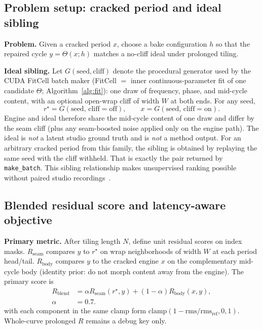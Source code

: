 \subsection{Problem setup: cracked period and ideal sibling}
\label{sec:ideal-tile}

\textbf{Problem.} Given a cracked period $x$, choose a bake configuration $h$ so that the repaired cycle $y=\Theta(x;h)$ matches a no-cliff ideal under prolonged tiling.

\textbf{Ideal sibling.}
Let $G(\mathrm{seed},\mathrm{cliff})$ denote the procedural generator used by the CUDA FitCell batch maker
(FitCell $=$ inner continuous-parameter fit of one candidate $\Theta$; Algorithm~\ref{alg:fit}):
one draw of frequency, phase, and mid-cycle content, with an optional open-wrap cliff of width $W$ at both ends.
For any seed,
\begin{equation}
\label{eq:G-siblings}
r^{\star}=G(\mathrm{seed},\,\mathrm{cliff{=}off}),\qquad
x=G(\mathrm{seed},\,\mathrm{cliff{=}on}).
\end{equation}
Engine and ideal therefore share the mid-cycle content of one draw and differ by the seam cliff (plus any seam-boosted noise applied only on the engine path).
The ideal is \emph{not} a latent studio ground truth and is \emph{not} a method output.
For an arbitrary cracked period from this family, the sibling is obtained by replaying the same seed with the cliff withheld.
That is exactly the pair returned by \texttt{make\_batch}.
This sibling relationship makes unsupervised ranking possible without paired studio recordings~\cite{lehtinen2018,kashyap2021n2n}.

\subsection{Blended residual score and latency-aware objective}
\label{sec:residual-score}

\textbf{Primary metric.}
After tiling length $N$, define unit residual scores on index masks.
$R_{\mathrm{seam}}$ compares $y$ to $r^{\star}$ on wrap neighborhoods of width $W$ at each period head/tail.
$R_{\mathrm{body}}$ compares $y$ to the cracked engine $x$ on the complementary mid-cycle body (identity prior: do not morph content away from the engine).
The primary score is
\begin{equation}
\label{eq:R-blend}
\begin{aligned}
R_{\mathrm{blend}}
&=\alpha R_{\mathrm{seam}}(r^{\star},y)+(1-\alpha)R_{\mathrm{body}}(x,y),\\
\alpha&=0.7.
\end{aligned}
\end{equation}
with each component in the same clamp form
$\mathrm{clamp}(1-\mathrm{rms}/\mathrm{rms}_{\mathrm{ref}},0,1)$.
Whole-curve prolonged $R$ remains a debug key only.


